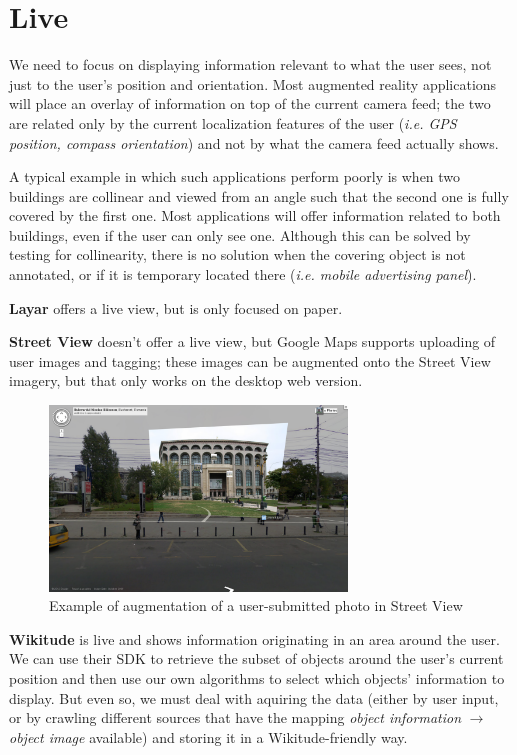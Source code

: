 \documentclass[a4paper,onecolumn,oneside,titlepage,11pt]{report}
\begin{document}
\section*{Live}
We need to focus on displaying information relevant to what the user sees, not just to the user's position and orientation. Most augmented reality applications will place an overlay of information on top of the current camera feed; the two are related only by the current localization features of the user (\emph{i.e. GPS position, compass orientation}) and not by what the camera feed actually shows.

A typical example in which such applications perform poorly is when two buildings are collinear and viewed from an angle such that the second one is fully covered by the first one. Most applications will offer information related to both buildings, even if the user can only see one. Although this can be solved by testing for collinearity, there is no solution when the covering object is not annotated, or if it is temporary located there (\emph{i.e. mobile advertising panel}).

\textbf{Layar} offers a live view, but is only focused on paper.

\textbf{Street View} doesn't offer a live view, but Google Maps supports uploading of user images and tagging; these images can be augmented onto the Street View imagery, but that only works on the desktop web version.

\begin{figure}[H]
\begin{center}
\includegraphics[width=7.9cm]{../../images/streetview_augmentation.png}
\caption{Example of augmentation of a user-submitted photo in Street View}
\end{center}
\end{figure}

\textbf{Wikitude} is live and shows information originating in an area around the user. We can use their SDK to retrieve the subset of objects around the user's current position and then use our own algorithms to select which objects' information to display. But even so, we must deal with aquiring the data (either by user input, or by crawling different sources that have the mapping \emph{object information} $\rightarrow$ \emph{object image} available) and storing it in a Wikitude-friendly way.
\end{document}

